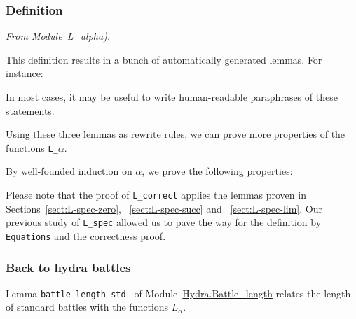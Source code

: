 \subsubsection{Definition}



\vspace{4pt}
\noindent
\emph{From Module~\href{../theories/html/hydras.Epsilon0.L_alpha.html\#L_}{L\_alpha}).}

\label{Functions:L-alpha}


 
This definition results in a bunch of automatically generated lemmas. For instance:





In most cases, it may be useful to write human-readable  paraphrases of these statements.



Using these three lemmas as rewrite rules, we can prove more properties of the functions \texttt{L\_$\alpha$}.



By  well-founded induction on $\alpha$, we prove the following properties:





\label{sect:L-correct-proof}

Please note that the proof of \texttt{L\_correct} applies the lemmas proven in Sections~\ref{sect:L-spec-zero}, ~\ref{sect:L-spec-succ} and ~\ref{sect:L-spec-lim}.
Our previous study of \texttt{L\_spec} allowed us to pave the way for the definition by \texttt{Equations} and the correctness proof.



\subsubsection{Back to hydra battles}
\label{def:L-alpha}

Lemma \texttt{battle\_length\_std } of
Module~\href{../theories/html/hydras.Hydra.Battle_length.html}{Hydra.Battle\_length} relates the length of standard battles with the functions $L_\alpha$.

